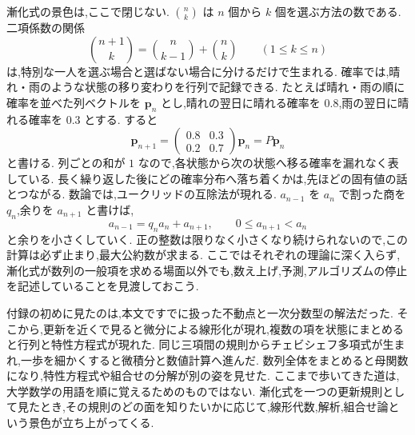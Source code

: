 漸化式の景色は,ここで閉じない.
$\binom{n}{k}$ は $n$ 個から $k$ 個を選ぶ方法の数である.
二項係数の関係
\[
  \binom{n+1}{k}=\binom{n}{k-1}+\binom{n}{k}
  \qquad(1\le k\le n)
\]
は,特別な一人を選ぶ場合と選ばない場合に分けるだけで生まれる.
確率では,晴れ・雨のような状態の移り変わりを行列で記録できる.
たとえば晴れ・雨の順に確率を並べた列ベクトルを $\boldsymbol p_n$ とし,晴れの翌日に晴れる確率を $0.8$,雨の翌日に晴れる確率を $0.3$ とする.
すると
\[
  \boldsymbol p_{n+1}
  =
  \begin{pmatrix}0.8&0.3\\0.2&0.7\end{pmatrix}\boldsymbol p_n
  =P\boldsymbol p_n
\]
と書ける.
列ごとの和が $1$ なので,各状態から次の状態へ移る確率を漏れなく表している.
長く繰り返した後にどの確率分布へ落ち着くかは,先ほどの固有値の話とつながる.
数論では,ユークリッドの互除法が現れる.
$a_{n-1}$ を $a_n$ で割った商を $q_n$,余りを $a_{n+1}$ と書けば,
\[
  a_{n-1}=q_na_n+a_{n+1},\qquad 0\le a_{n+1}<a_n
\]
と余りを小さくしていく.
正の整数は限りなく小さくなり続けられないので,この計算は必ず止まり,最大公約数が求まる.
ここではそれぞれの理論に深く入らず,漸化式が数列の一般項を求める場面以外でも,数え上げ,予測,アルゴリズムの停止を記述していることを見渡しておこう.

付録の初めに見たのは,本文ですでに扱った不動点と一次分数型の解法だった.
そこから,更新を近くで見ると微分による線形化が現れ,複数の項を状態にまとめると行列と特性方程式が現れた.
同じ三項間の規則からチェビシェフ多項式が生まれ,一歩を細かくすると微積分と数値計算へ進んだ.
数列全体をまとめると母関数になり,特性方程式や組合せの分解が別の姿を見せた.
ここまで歩いてきた道は,大学数学の用語を順に覚えるためのものではない.
漸化式を一つの更新規則として見たとき,その規則のどの面を知りたいかに応じて,線形代数,解析,組合せ論という景色が立ち上がってくる.
